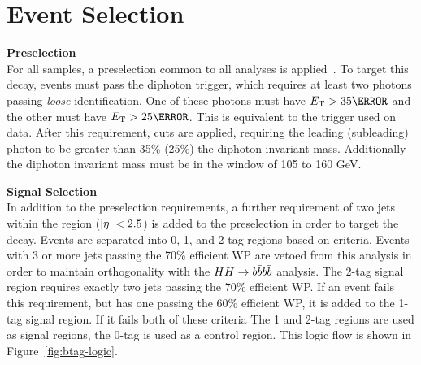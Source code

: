 \section{Event Selection}\label{sec:yybb-event-selection}
\noindent\textbf{Preselection}\\
\indent For all samples, a preselection common to all \Hgg analyses is applied~\cite{hgam-preselection}. To target this decay, events must pass the diphoton trigger, which requires at least two photons passing \textit{loose} identification. One of these photons must have $\et > \unit{35}{\GeV}$ and the other must have $\et > \unit{25}{\GeV}$. This is equivalent to the  trigger used on data. After this requirement, \pt cuts are applied, requiring the leading (subleading) photon \pt to be greater than 35\% (25\%) the diphoton invariant mass. Additionally the diphoton invariant mass must be in the window of 105 to 160 GeV.

\noindent\textbf{Signal Selection}\\
\indent In addition to the preselection requirements, a further requirement of two jets within the \btagging region ($|\eta| <2.5$) is added to the preselection in order to target the \Hbb decay. Events are separated into 0, 1, and 2-tag regions based on \btagging criteria. Events with 3 or more jets passing the 70\% efficient \btagging \gls{WP} are vetoed from this analysis in order to maintain orthogonality with the $HH \rightarrow b\bar{b} b\bar{b}$ analysis. The 2-tag signal region requires exactly two jets passing the 70\% efficient \btagging \gls{WP}. If an event fails this requirement, but has one \bjet passing the 60\% efficient \btagging \gls{WP}, it is added to the 1-tag signal region. If it fails both of these criteria The 1 and 2-tag regions are used as signal regions, the 0-tag is used as a control region. This logic flow is shown in Figure~\ref{fig:btag-logic}.


